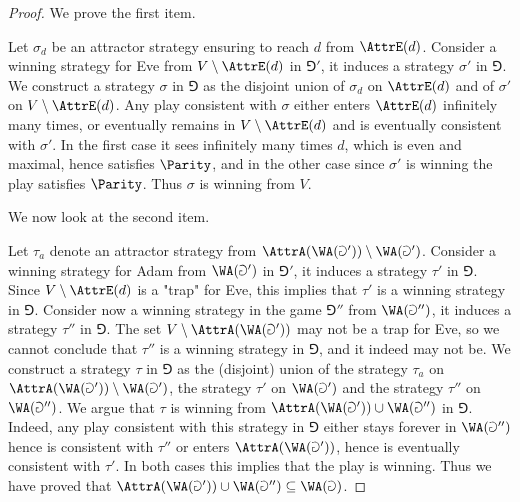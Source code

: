 

\begin{proof}
We prove the first item. 

Let $\sigma_d$ be an attractor strategy ensuring to reach $d$ from $\AttrE(d)$.
Consider a winning strategy for Eve from $V \setminus \AttrE(d)$ in $\Game'$, it induces a strategy $\sigma'$ in $\Game$.
We construct a strategy $\sigma$ in $\Game$ as the disjoint union of $\sigma_d$ on $\AttrE(d)$ and of $\sigma'$ on $V \setminus \AttrE(d)$.
Any play consistent with $\sigma$ either enters $\AttrE(d)$ infinitely many times, 
or eventually remains in $V \setminus \AttrE(d)$ and is eventually consistent with $\sigma'$.
In the first case it sees infinitely many times $d$, which is even and maximal, hence satisfies $\Parity$, 
and in the other case since $\sigma'$ is winning the play satisfies $\Parity$.
Thus $\sigma$ is winning from $V$.

We now look at the second item.

Let $\tau_a$ denote an attractor strategy %
from $\AttrA(\WA(\Game')) \setminus \WA(\Game')$.
Consider a winning strategy for Adam from $\WA(\Game')$ in $\Game'$, it induces a strategy $\tau'$ in $\Game$.
Since $V \setminus \AttrE(d)$ is a "trap" for Eve, this implies that $\tau'$ is a winning strategy in $\Game$.
Consider now a winning strategy in the game $\Game''$ from $\WA(\Game'')$, it induces a strategy $\tau''$ in $\Game$.
The set $V \setminus \AttrA( \WA(\Game') )$ may not be a trap for Eve, so we cannot conclude that $\tau''$ is a winning strategy in $\Game$,
and it indeed may not be.
We construct a strategy $\tau$ in $\Game$ as the (disjoint) union of the strategy $\tau_a$ on $\AttrA(\WA(\Game')) \setminus \WA(\Game')$,
the strategy $\tau'$ on $\WA(\Game')$ and the strategy $\tau''$ on $\WA(\Game'')$.
We argue that $\tau$ is winning from $\AttrA( \WA(\Game') ) \cup \WA(\Game'')$ in $\Game$.
Indeed, any play consistent with this strategy in $\Game$ either stays forever in $\WA(\Game'')$ hence is consistent with $\tau''$
or enters $\AttrA( \WA(\Game') )$, hence is eventually consistent with $\tau'$.
In both cases this implies that the play is winning.
Thus we have proved that $\AttrA( \WA(\Game') ) \cup \WA(\Game'') \subseteq \WA(\Game)$.


\end{proof}
